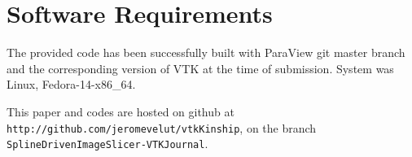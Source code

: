 \documentclass{InsightArticle}
\begin{document}
\section{Software Requirements}
%
The provided code has been successfully built with ParaView git master branch
and the corresponding version of VTK at the time of submission. System was
Linux, Fedora-14-x86\_64.

This paper and codes are hosted on github at
\verb|http://github.com/jeromevelut/vtkKinship|, on the branch
\verb|SplineDrivenImageSlicer-VTKJournal|.
%
%
%


%
\end{document}

